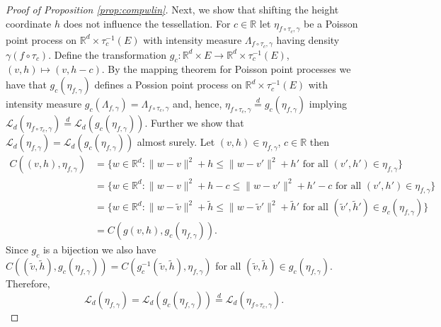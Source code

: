 \documentclass[11pt,a4paper]{article}
\theoremstyle{plain}
\theoremstyle{definition}
\theoremstyle{remark}
\def\RR{\mathbb{R}}
\def\cL{\mathcal{L}}
\begin{document}
\begin{proof}[Proof of Proposition \ref{prop:compwlin}]
    Next, we show that shifting the height coordinate $h$ does not influence the tessellation. For $c\in \RR$ let $\eta_{f\circ \tau_c,\gamma}$ be a Poisson point process on $\RR^d \times \tau_c^{-1}(E)$ with intensity measure $\Lambda_{f\circ \tau_c,\gamma}$ having density $\gamma (f\circ \tau_c)$. Define the transformation $g_c\colon\RR^d\times E\to\RR^d\times\tau_c^{-1}(E)$, $(v,h)\mapsto(v,h-c)$. By the mapping theorem for Poisson point processes \cite[Theorem 5.1]{LP} we have that $g_c(\eta_{f,\gamma})$ defines a Possion point process on $\RR^d\times\tau_c^{-1}(E)$ with intensity measure $g_c(\Lambda_{f,\gamma})=\Lambda_{f\circ \tau_c,\gamma}$ and, hence, $\eta_{f\circ \tau_c,\gamma}\overset{d}{ =} g_c(\eta_{f,\gamma})$ implying $\cL_d(\eta_{f\circ \tau_c,\gamma})\overset{d}{=}\cL_d(g_c(\eta_{f,\gamma}))$.  Further we show that $\cL_d(\eta_{f,\gamma})=\cL_d(g_c(\eta_{f,\gamma}))$ almost surely. Let $(v,h)\in \eta_{f,\gamma}$, $c\in\RR$ then
    \begin{align*}
        C((v,h),\eta_{f,\gamma})&=\{w\in\RR^d:\|w-v\|^2+h\le\|w-v'\|^2+h'\text{ for all } (v',h')\in\eta_{f,\gamma}\}\\
        &=\{w\in\RR^d:\|w-v\|^2+h-c\le\|w-v'\|^2+h'-c\text{ for all } (v',h')\in\eta_{f,\gamma}\}\\
        &=\{w\in\RR^d:\|w-\widetilde{v}\|^2+\widetilde{h}\le\|w-\widetilde{v}'\|^2+\widetilde{h}'\text{ for all } (\widetilde{v}',\widetilde{h}')\in g_c(\eta_{f,\gamma})\}\\
        &=C(g(v,h),g_c(\eta_{f,\gamma})).
    \end{align*}
    Since $g_c$ is a bijection we also have $C((\widetilde{v},\widetilde{h}),g_c(\eta_{f,\gamma}))=C(g_c^{-1}(\widetilde{v},\widetilde{h}),\eta_{f,\gamma})$ for all $(\widetilde{v},\widetilde{h})\in g_c(\eta_{f,\gamma})$. Therefore,
    \[
    \cL_d(\eta_{f,\gamma})=\cL_d(g_c(\eta_{f,\gamma}))\overset{d}{=}\cL_d(\eta_{f\circ \tau_c,\gamma}).
    \]


\end{proof}
\end{document}
